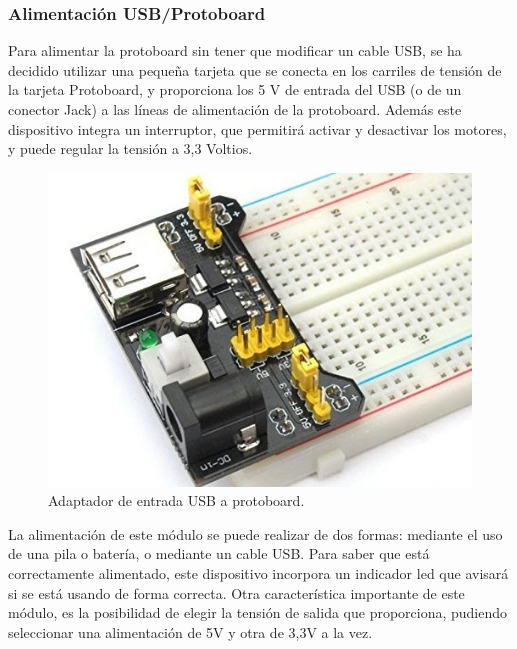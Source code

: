 \subsubsection{ Alimentación USB/Protoboard }

Para alimentar la protoboard sin tener que modificar un cable USB, se ha decidido utilizar una pequeña tarjeta que se conecta en los carriles de tensión de la tarjeta Protoboard, y
proporciona los 5 V de entrada del USB (o de un conector Jack) a las líneas de alimentación de la protoboard. Además este dispositivo integra un interruptor, que permitirá activar y
desactivar los motores, y puede regular la tensión a 3,3 Voltios.\\

\begin{figure}[H]
  \begin{center}
    \includegraphics[scale=0.3]{imagenes/alimentador_usb_protoboard.jpg}
  \end{center}
  \caption{Adaptador de entrada USB a protoboard.}
  \label{figura:alimentador_usb_protoboard}
\end{figure}

La alimentación de este módulo se puede realizar de dos formas: mediante el uso de una pila o batería, o mediante un cable USB. Para saber que está correctamente alimentado, este 
dispositivo incorpora un indicador led que avisará si se está usando de forma correcta. Otra característica importante de este módulo, es la posibilidad de elegir la tensión de
salida que proporciona, pudiendo seleccionar una alimentación de 5V y otra de 3,3V a la vez.\\

